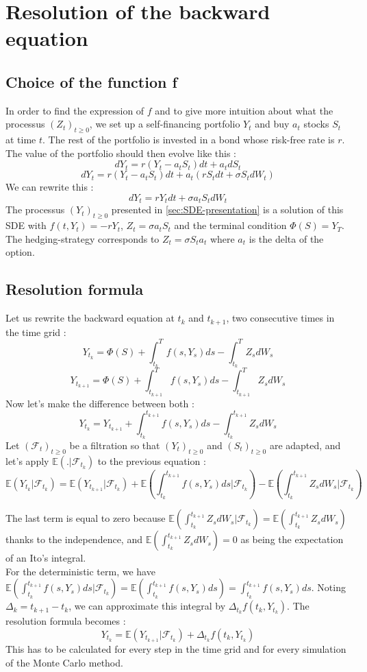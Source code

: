 \documentclass[a4paper,11pt,english]{book}
\begin{document}
\section{Resolution of the backward equation}
\subsection{Choice of the function f}
\label{subsec:choice-of-f}
In order to find the expression of $f$ and to give more intuition about what the processus $(Z_{t})_{t\geq0}$, we set up a self-financing portfolio $Y_{t}$ and buy $a_{t}$ stocks $S_{t}$ at time $t$. The rest of the portfolio is invested in a bond whose risk-free rate is $r$. The value of the portfolio should then evolve like this :
$$dY_{t} = r(Y_{t}-a_{t}S_{t})dt + a_{t}dS_{t}$$
$$dY_{t} = r(Y_{t}-a_{t}S_{t})dt + a_{t}(rS_{t}dt+\sigma S_{t}dW_{t})$$
We can rewrite this :
$$dY_{t} = rY_{t}dt + \sigma a_{t}S_{t}dW_{t}$$
The processus $(Y_{t})_{t\geq0}$ presented in \ref{sec:SDE-presentation} is a solution of this SDE with $f(t,Y_{t})=-rY_{t}$, $Z_{t} = \sigma a_{t}S_{t}$ and the terminal condition $\Phi(S)=Y_{T}$.
The hedging-strategy corresponds to $Z_{t}=\sigma S_{t} a_{t}$ where $a_{t}$ is the delta of the option. 
\subsection{Resolution formula}
Let us rewrite the backward equation at $t_{k}$ and $t_{k+1}$, two consecutive times in the time grid :
$$Y_{t_{k}} = \Phi(S) + \int_{t_{k}}^{T} f(s,Y_{s}) ds - \int_{t_{k}}^{T} Z_{s} dW_{s}$$
$$Y_{t_{k+1}} = \Phi(S) + \int_{t_{k+1}}^{T} f(s,Y_{s}) ds - \int_{t_{k+1}}^{T} Z_{s} dW_{s}$$
Now let's make the difference between both :
$$Y_{t_{k}} = Y_{t_{k+1}} + \int_{t_{k}}^{t_{k+1}} f(s,Y_{s}) ds - \int_{t_{k}}^{t_{k+1}}Z_{s} dW_{s}$$
Let $(\mathcal{F}_{t})_{t\geq0}$ be a filtration so that $(Y_{t})_{t\geq0}$ and $(S_{t})_{t\geq0}$ are adapted, and let's apply $\mathbb{E}(.|\mathcal{F}_{t_{k}})$ to the previous equation :
$$\mathbb{E}(Y_{t_{k}}|\mathcal{F}_{t_{k}}) = \mathbb{E}(Y_{t_{k+1}}|\mathcal{F}_{t_{k}}) + \mathbb{E}(\int_{t_{k}}^{t_{k+1}} f(s,Y_{s}) ds|\mathcal{F}_{t_{k}}) - \mathbb{E}(\int_{t_{k}}^{t_{k+1}}Z_{s} dW_{s}|\mathcal{F}_{t_{k}})$$

The last term is equal to zero because $\mathbb{E}(\int_{t_{k}}^{t_{k+1}}Z_{s} dW_{s}|\mathcal{F}_{t_{k}})=\mathbb{E}(\int_{t_{k}}^{t_{k+1}}Z_{s} dW_{s})$ thanks to the independence, and $\mathbb{E}(\int_{t_{k}}^{t_{k+1}}Z_{s} dW_{s})=0$ as being the expectation of an Ito's integral.\\
For the deterministic term, we have $\mathbb{E}(\int_{t_{k}}^{t_{k+1}}f(s,Y_{s}) ds|\mathcal{F}_{t_{k}})=\mathbb{E}(\int_{t_{k}}^{t_{k+1}}f(s,Y_{s}) ds) = \int_{t_{k}}^{t_{k+1}}f(s,Y_{s}) ds$. Noting $\Delta_{k}=t_{k+1}-t_{k}$, we can approximate this integral by $\Delta_{t_{k}}f(t_{k},Y_{t_{k}})$.
The resolution formula becomes :
\begin{equation}
Y_{t_{k}} = \mathbb{E}(Y_{t_{k+1}}|\mathcal{F}_{t_{k}}) + \Delta_{t_{k}}f(t_{k},Y_{t_{k}})
\label{resolutionFormula}
\end{equation}
This has to be calculated for every step in the time grid and for every simulation of the Monte Carlo method.
\end{document}
